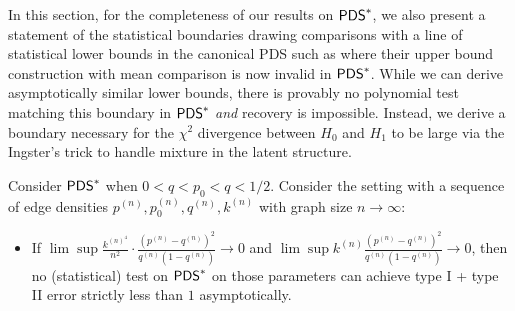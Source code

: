 \documentclass[final,12pt]{colt2023} %
\newcommand\1[1]{\mathbb{I}_{\left\{#1\right\}}}
\begin{document}
 \spac In this section, for the completeness of our results on $\mathsf{PDS}^*$, we also present a statement of the statistical boundaries drawing comparisons with a line of statistical lower bounds in the canonical PDS such as \cite{Ingster13,HWX15,MaWu} where their upper bound construction with mean comparison is now invalid in $\mathsf{PDS}^*$. While we can derive asymptotically similar lower bounds, there is provably no polynomial test matching this boundary in $\mathsf{PDS}^*$ \emph{and} recovery is impossible.  
Instead, we derive a boundary necessary for the $\chi^2$ divergence between $H_0$ and $H_1$ to be large via the Ingster's trick to handle mixture in the latent structure.
\begin{theorem} \label{StatBound} Consider $\mathsf{PDS}^*$ when $0<q<p_0<q<1/2$. Consider the setting with a sequence of edge densities $p^{(n)}, p_0^{(n)}, q^{(n)}, k^{(n)}$ with graph size $n\to\infty$:
\begin{itemize}
    \item If $\lim\sup\frac{k^{(n)^4}}{n^2}\cdot\frac{(p^{(n)}-q^{(n)})^2}{q^{(n)}(1-q^{(n)})}\to0$ and $\lim\sup k^{(n)}\frac{(p^{(n)}-q^{(n)})^2}{q^{(n)}(1-q^{(n)})}\to 0$, then no (statistical) test on $\mathsf{PDS}^*$ on those parameters can achieve type I + type II error strictly less than $1$ asymptotically.
\end{itemize}

\end{theorem}
\end{document}

